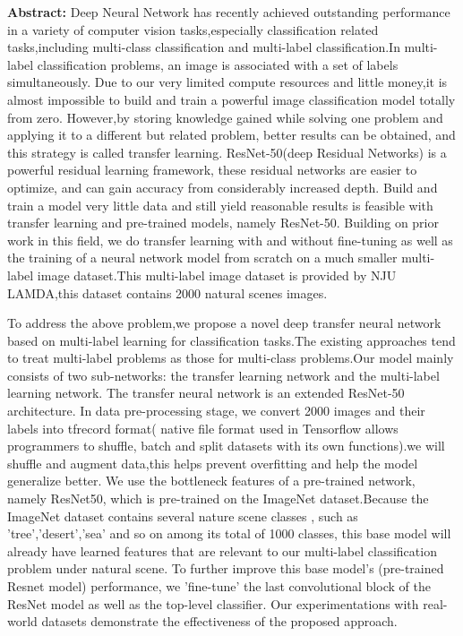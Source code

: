 {\renewcommand\baselinestretch{1}\selectfont
\noindent\textbf{Abstract: }
Deep Neural Network has recently achieved outstanding performance in a variety of computer 
vision tasks,especially classification related tasks,including multi-class classification 
 and multi-label classification.In multi-label classification problems, an image is associated 
 with a set of labels simultaneously.
Due to our very limited compute resources and little money,it is almost impossible to 
build and train a powerful image classification model totally from zero.
However,by storing knowledge gained while solving one problem and applying it to a different
but related problem, better results can be obtained, and this strategy is called transfer learning. 
ResNet-50(deep Residual Networks) is a powerful residual learning framework,
these residual networks are easier to optimize, and can gain accuracy from 
considerably increased depth. Build and train a model very little data 
and still yield reasonable results is feasible with transfer learning and pre-trained
models, namely ResNet-50.
Building on prior work in this field, we do transfer learning with and without fine-tuning 
as well as the training of a neural network model from scratch on a much smaller 
multi-label image dataset.This multi-label image dataset is provided by NJU LAMDA,this dataset 
contains 2000 natural scenes images.

To address the above problem,we propose a novel deep transfer neural network based on 
multi-label learning for classification tasks.The existing approaches tend to treat multi-label problems as those for multi-class 
problems.Our model mainly consists of two sub-networks: the transfer learning network and the multi-label learning network.
The transfer neural network is an extended ResNet-50 architecture.
In data pre-processing stage, we convert 2000 images and their labels into tfrecord format(
native file format used in Tensorflow allows programmers to shuffle, batch and split datasets with its 
own functions).we will shuffle and augment data,this helps prevent overfitting and help the 
model generalize better. We use the bottleneck features of a pre-trained network, namely ResNet50, 
which is pre-trained on the ImageNet dataset.Because the ImageNet dataset contains several nature scene classes
, such as 'tree','desert','sea' and so on among its total of 1000 classes, this base model will
already have learned features that are relevant to our multi-label classification problem under 
natural scene. To further improve this base model's (pre-trained Resnet model) performance,
we 'fine-tune' the last convolutional block of the ResNet model as well as the top-level classifier.
Our experimentations with real-world datasets demonstrate the effectiveness of the proposed approach.

}

